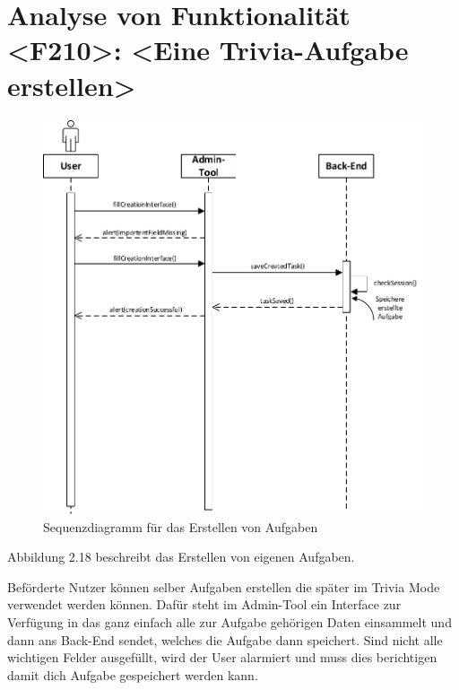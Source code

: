 \section{Analyse von Funktionalität <F210>: <Eine Trivia-Aufgabe erstellen>}
\begin{figure}[h]
\centering
\includegraphics[width=1.3\textwidth]{figures/sequenz_F210.pdf}
\caption{Sequenzdiagramm für das Erstellen von Aufgaben}
\label{sequence}
\end{figure}
Abbildung 2.18 beschreibt das Erstellen von eigenen Aufgaben.

Beförderte Nutzer können selber Aufgaben erstellen die später im Trivia Mode verwendet werden können.
Dafür steht im Admin-Tool ein Interface zur Verfügung in das ganz einfach alle zur Aufgabe gehörigen Daten einsammelt und dann ans Back-End sendet, welches die Aufgabe dann speichert. Sind nicht alle wichtigen Felder ausgefüllt, wird der User alarmiert und muss dies berichtigen damit dich Aufgabe gespeichert werden kann.

\newpage
